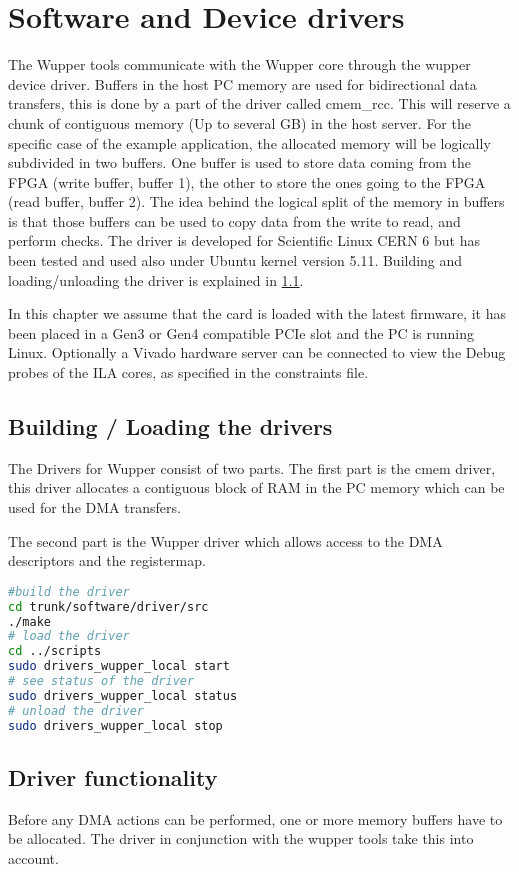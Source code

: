 \section{Software and Device drivers}
The Wupper tools communicate with the Wupper core through the wupper device driver. Buffers in the host PC memory are used for bidirectional data transfers, this is done by a part of the driver called cmem\_rcc. This will reserve a chunk of contiguous memory (Up to several GB) in the host server. For the specific case of the example application, the allocated memory will be logically subdivided in two buffers. One buffer is used to store data coming from the FPGA (write buffer, buffer 1), the other to store the ones going to the FPGA (read buffer, buffer 2). The idea behind the logical split of the memory in buffers is that those buffers can be used to copy data from the write to read, and perform checks. The driver is developed for Scientific Linux CERN 6 but has been tested and used also under Ubuntu kernel version 5.11. Building and loading/unloading the driver is explained in \ref{sec:buildloadDrivers}.

In this chapter we assume that the card is loaded with the latest firmware, it has been placed in a Gen3 or Gen4 compatible PCIe slot and the PC is running Linux. Optionally a Vivado hardware server can be connected to view the Debug probes of the ILA cores, as specified in the constraints file. \cite{programming}\

\subsection{Building / Loading the drivers}
\label{sec:buildloadDrivers}
The Drivers for Wupper consist of two parts. The first part is the cmem driver, this driver allocates a contiguous block of RAM in the PC memory which can be used for the DMA transfers.

The second part is the Wupper driver which allows access to the DMA descriptors and the registermap.
\begin{lstlisting}[language=BASH, frame=single, caption=Building and Loading the driver]
#build the driver
cd trunk/software/driver/src
./make
# load the driver
cd ../scripts
sudo drivers_wupper_local start
# see status of the driver
sudo drivers_wupper_local status
# unload the driver
sudo drivers_wupper_local stop
\end{lstlisting}
\subsection{Driver functionality}
Before any DMA actions can be performed, one or more memory buffers have to be allocated. The driver in conjunction with the wupper tools take this into account. 

